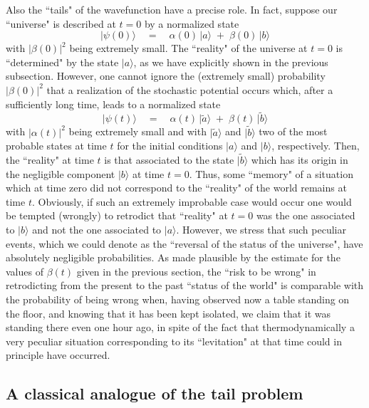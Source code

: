 \documentclass[12pt]{article}
\begin{document}
Also the ``tails" of the wavefunction have a precise role. In
fact, suppose our ``universe" is described at $t = 0$ by a
normalized state
\begin{equation}
|\psi(0)\rangle \quad = \quad \alpha(0)\,|a\rangle \; + \;
\beta(0)\, |b\rangle
\end{equation}
with $|\beta(0)|^{2}$ being extremely small. The ``reality" of the
universe at $t = 0$ is ``determined" by the state $|a\rangle$, as
we have explicitly shown in the previous subsection. However, one
cannot ignore the (extremely small) probability $|\beta(0)|^{2}$
that a realization of the stochastic potential occurs which, after
a sufficiently long time, leads to a normalized state
\begin{equation}
|\psi(t)\rangle \quad = \quad \alpha(t)\,|\tilde a\rangle \; + \;
\beta(t)\, |\tilde b\rangle
\end{equation}
with $|\alpha(t)|^{2}$  being extremely small and with $|\tilde
a\rangle$ and $|\tilde b\rangle$ two of the most probable states
at time $t$ for the initial conditions $|a\rangle$ and
$|b\rangle$, respectively. Then, the ``reality" at time $t$ is
that associated to the state $|\tilde b\rangle$ which has its
origin in the negligible component $|b\rangle$ at time $t = 0$.
Thus, some ``memory" of a situation which at time zero did not
correspond to the ``reality" of the world remains at time $t$.
Obviously, if such an extremely improbable case would occur one
would be tempted (wrongly) to retrodict that ``reality" at $t = 0$
was the one associated to $|b\rangle$ and not the one associated
to $|a\rangle$. However, we stress that such peculiar events,
which we could denote as the ``reversal of the status of the
universe", have absolutely negligible probabilities. As made
plausible by the estimate for the values of $\beta(t)$ given in
the previous section, the ``risk to be wrong" in retrodicting from
the present to the past ``status of the world" is comparable with
the probability of being wrong when, having observed now a table standing
on the floor, and knowing that it has been kept isolated, we claim
that it was standing there even one hour ago, in spite of the fact that
thermodynamically a very peculiar situation corresponding to its
``levitation" at that time could in principle have occurred.

\subsection{A classical analogue of the tail problem}
\label{sec137}
\end{document}
